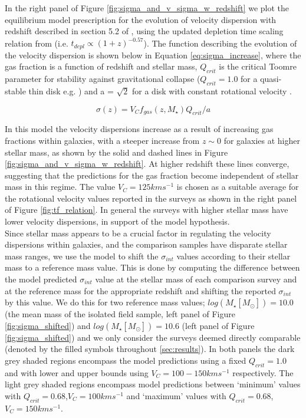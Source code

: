 \documentclass[fleqn,usenatbib]{mn2e}
\begin{document}
In the right panel of Figure \ref{fig:sigma_and_v_sigma_w_redshift} we plot the equilibrium model prescription for the evolution of velocity dispersion with redshift described in section 5.2 of \cite{Wisnioski2015}, using the updated depletion time scaling relation from \cite{Tacconi2017} (i.e. $t_{depl} \propto (1 + z)^{-0.57}$).
The function describing the evolution of the velocity dispersion is shown below in Equation \ref{eq:sigma_increase}, where the gas fraction is a function of redshift and stellar mass, $Q_{crit}$ is the critical Toomre parameter for stability against gravitational collapse \citep{Toomre1964} ($Q_{crit} = 1.0$ for a quasi-stable thin disk e.g. \citealt{ForsterSchreiber2006,Burkert2010,Genzel2011,Wisnioski2015}) and a = $\sqrt{2}$ for a disk with constant rotational velocity \citep{Wisnioski2015}. 

\begin{equation}\label{eq:sigma_increase}
    \sigma(z) = V_{C}f_{gas}(z,M_{\star})Q_{crit}/a
\end{equation}

In this model the velocity dispersions increase as a result of increasing gas fractions within galaxies, with a steeper increase from $z\sim0$ for galaxies at higher stellar mass, as shown by the solid and dashed lines in Figure \ref{fig:sigma_and_v_sigma_w_redshift}.
At higher redshift these lines converge, suggesting that the predictions for the gas fraction become independent of stellar mass in this regime.
The value $V_{C}=125kms^{-1}$ is chosen as a suitable average for the rotational velocity values reported in the surveys as shown in the right panel of Figure \ref{fig:tf_relation}.
In general the surveys with higher stellar mass have lower velocity dispersions, in support of the model hypothesis. \\

Since stellar mass appears to be a crucial factor in regulating the velocity dispersions within galaxies, and the comparison samples have disparate stellar mass ranges, we use the model to shift the $\sigma_{int}$ values according to their stellar mass to a reference mass value.
This is done by computing the difference between the model predicted $\sigma_{int}$ value at the stellar mass of each comparison survey and at the reference mass for the appropriate redshift and shifting the reported $\sigma_{int}$ by this value.
We do this for two reference mass values; $log(M_{\star}[M_{\odot}]) = 10.0$ (the mean mass of the isolated field sample, left panel of Figure \ref{fig:sigma_shifted}) and $log(M_{\star}[M_{\odot}]) = 10.6$ (left panel of Figure \ref{fig:sigma_shifted}) and we only consider the surveys deemed directly comparable (denoted by the filled symbols throughout \cref{sec:results}).
In both panels the dark grey shaded regions encompass the model predictions using a fixed $Q_{crit} = 1.0$ and with lower and upper bounds using $V_{C} = 100-150kms^{-1}$ respectively.
The light grey shaded regions encompass model predictions between `minimum' values with $Q_{crit} = 0.68$,$V_{C}=100kms^{-1}$ and `maximum' values with $Q_{crit} = 0.68$,$V_{C}=150kms^{-1}$. \\
\end{document}
